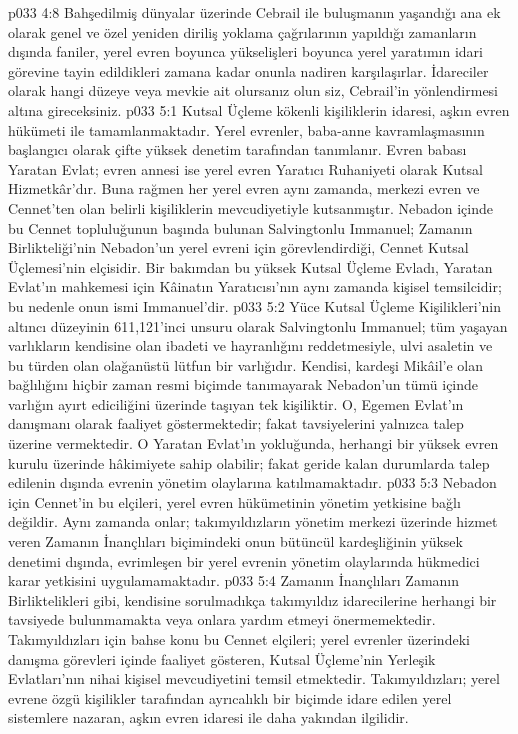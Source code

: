 \vs p033 4:8 Bahşedilmiş dünyalar üzerinde Cebrail ile buluşmanın yaşandığı ana ek olarak genel ve özel yeniden diriliş yoklama çağrılarının yapıldığı zamanların dışında faniler, yerel evren boyunca yükselişleri boyunca yerel yaratımın idari görevine tayin edildikleri zamana kadar onunla nadiren karşılaşırlar. İdareciler olarak hangi düzeye veya mevkie ait olursanız olun siz, Cebrail’in yönlendirmesi altına gireceksiniz.
\vs p033 5:1 Kutsal Üçleme kökenli kişiliklerin idaresi, aşkın evren hükümeti ile tamamlanmaktadır. Yerel evrenler, baba\hyp{}anne kavramlaşmasının başlangıcı olarak çifte yüksek denetim tarafından tanımlanır. Evren babası Yaratan Evlat; evren annesi ise yerel evren Yaratıcı Ruhaniyeti olarak Kutsal Hizmetkâr’dır. Buna rağmen her yerel evren aynı zamanda, merkezi evren ve Cennet’ten olan belirli kişiliklerin mevcudiyetiyle kutsanmıştır. Nebadon içinde bu Cennet topluluğunun başında bulunan Salvingtonlu Immanuel; Zamanın Birlikteliği’nin Nebadon’un yerel evreni için görevlendirdiği, Cennet Kutsal Üçlemesi’nin elçisidir. Bir bakımdan bu yüksek Kutsal Üçleme Evladı, Yaratan Evlat’ın mahkemesi için Kâinatın Yaratıcısı’nın aynı zamanda kişisel temsilcidir; bu nedenle onun ismi Immanuel’dir.
\vs p033 5:2 Yüce Kutsal Üçleme Kişilikleri’nin altıncı düzeyinin 611,121’inci unsuru olarak Salvingtonlu Immanuel; tüm yaşayan varlıkların kendisine olan ibadeti ve hayranlığını reddetmesiyle, ulvi asaletin ve bu türden olan olağanüstü lütfun bir varlığıdır. Kendisi, kardeşi Mikâil’e olan bağlılığını hiçbir zaman resmi biçimde tanımayarak Nebadon’un tümü içinde varlığın ayırt ediciliğini üzerinde taşıyan tek kişiliktir. O, Egemen Evlat’ın danışmanı olarak faaliyet göstermektedir; fakat tavsiyelerini yalnızca talep üzerine vermektedir. O Yaratan Evlat’ın yokluğunda, herhangi bir yüksek evren kurulu üzerinde hâkimiyete sahip olabilir; fakat geride kalan durumlarda talep edilenin dışında evrenin yönetim olaylarına katılmamaktadır.
\vs p033 5:3 Nebadon için Cennet’in bu elçileri, yerel evren hükümetinin yönetim yetkisine bağlı değildir. Aynı zamanda onlar; takımyıldızların yönetim merkezi üzerinde hizmet veren Zamanın İnançlıları biçimindeki onun bütüncül kardeşliğinin yüksek denetimi dışında, evrimleşen bir yerel evrenin yönetim olaylarında hükmedici karar yetkisini uygulamamaktadır.
\vs p033 5:4 Zamanın İnançlıları Zamanın Birliktelikleri gibi, kendisine sorulmadıkça takımyıldız idarecilerine herhangi bir tavsiyede bulunmamakta veya onlara yardım etmeyi önermemektedir. Takımyıldızları için bahse konu bu Cennet elçileri; yerel evrenler üzerindeki danışma görevleri içinde faaliyet gösteren, Kutsal Üçleme’nin Yerleşik Evlatları’nın nihai kişisel mevcudiyetini temsil etmektedir. Takımyıldızları; yerel evrene özgü kişilikler tarafından ayrıcalıklı bir biçimde idare edilen yerel sistemlere nazaran, aşkın evren idaresi ile daha yakından ilgilidir.
